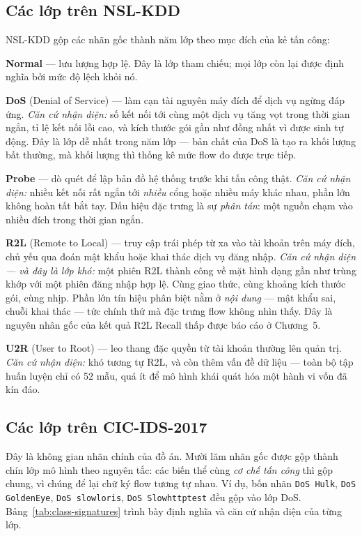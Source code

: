 \documentclass[../DoAn.tex]{subfiles}
\begin{document}
\subsection{Các lớp trên NSL-KDD}
\label{subsec:lop-nslkdd}

NSL-KDD gộp các nhãn gốc thành năm lớp theo mục đích của kẻ tấn công:

\textbf{Normal} --- lưu lượng hợp lệ. Đây là lớp tham chiếu; mọi lớp còn lại được định nghĩa bởi mức độ lệch khỏi nó.

\textbf{DoS} (Denial of Service) --- làm cạn tài nguyên máy đích để dịch vụ ngừng đáp ứng. \textit{Căn cứ nhận diện:} số kết nối tới cùng một dịch vụ tăng vọt trong thời gian ngắn, tỉ lệ kết nối lỗi cao, và kích thước gói gần như đồng nhất vì được sinh tự động. Đây là lớp dễ nhất trong năm lớp --- bản chất của DoS là tạo ra khối lượng bất thường, mà khối lượng thì thống kê mức flow đo được trực tiếp.

\textbf{Probe} --- dò quét để lập bản đồ hệ thống trước khi tấn công thật. \textit{Căn cứ nhận diện:} nhiều kết nối rất ngắn tới \textit{nhiều} cổng hoặc nhiều máy khác nhau, phần lớn không hoàn tất bắt tay. Dấu hiệu đặc trưng là sự \textit{phân tán}: một nguồn chạm vào nhiều đích trong thời gian ngắn.

\textbf{R2L} (Remote to Local) --- truy cập trái phép từ xa vào tài khoản trên máy đích, chủ yếu qua đoán mật khẩu hoặc khai thác dịch vụ đăng nhập. \textit{Căn cứ nhận diện --- và đây là lớp khó:} một phiên R2L thành công về mặt hình dạng gần như trùng khớp với một phiên đăng nhập hợp lệ. Cùng giao thức, cùng khoảng kích thước gói, cùng nhịp. Phần lớn tín hiệu phân biệt nằm ở \textit{nội dung} --- mật khẩu sai, chuỗi khai thác --- tức chính thứ mà đặc trưng flow không nhìn thấy. Đây là nguyên nhân gốc của kết quả R2L Recall thấp được báo cáo ở Chương~5.

\textbf{U2R} (User to Root) --- leo thang đặc quyền từ tài khoản thường lên quản trị. \textit{Căn cứ nhận diện:} khó tương tự R2L, và còn thêm vấn đề dữ liệu --- toàn bộ tập huấn luyện chỉ có 52 mẫu, quá ít để mô hình khái quát hóa một hành vi vốn đã kín đáo.

\subsection{Các lớp trên CIC-IDS-2017}
\label{subsec:lop-cic}

Đây là không gian nhãn chính của đồ án. Mười lăm nhãn gốc được gộp thành chín lớp mô hình theo nguyên tắc: các biến thể cùng \textit{cơ chế tấn công} thì gộp chung, vì chúng để lại chữ ký flow tương tự nhau. Ví dụ, bốn nhãn \texttt{DoS Hulk}, \texttt{DoS GoldenEye}, \texttt{DoS slowloris}, \texttt{DoS Slowhttptest} đều gộp vào lớp DoS. Bảng~\ref{tab:class-signatures} trình bày định nghĩa và căn cứ nhận diện của từng lớp.
\end{document}
